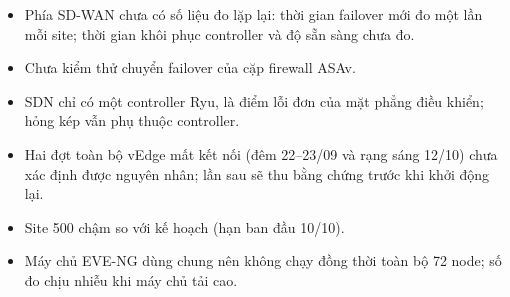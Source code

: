 \begin{itemize}
    \item Phía SD-WAN chưa có số liệu đo lặp lại: thời gian failover mới đo một lần mỗi site; thời gian khôi phục controller và độ sẵn sàng chưa đo.
    \item Chưa kiểm thử chuyển failover của cặp firewall ASAv.
    \item SDN chỉ có một controller Ryu, là điểm lỗi đơn của mặt phẳng điều khiển; hỏng kép vẫn phụ thuộc controller.
    \item Hai đợt toàn bộ vEdge mất kết nối (đêm 22--23/09 và rạng sáng 12/10) chưa xác định được nguyên nhân; lần sau sẽ thu bằng chứng trước khi khởi động lại.
    \item Site 500 chậm so với kế hoạch (hạn ban đầu 10/10).
    \item Máy chủ EVE-NG dùng chung nên không chạy đồng thời toàn bộ 72 node; số đo chịu nhiễu khi máy chủ tải cao.
\end{itemize}
